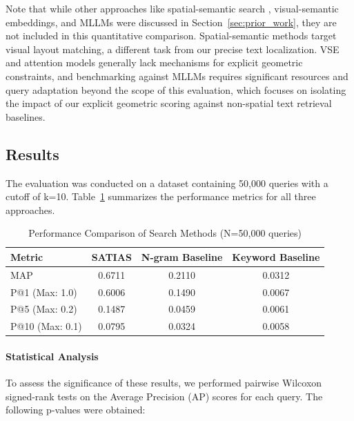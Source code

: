 \documentclass[manuscript,screen]{acmart}
\begin{document}
Note that while other approaches like spatial-semantic search \cite{Mai17}, visual-semantic embeddings, and MLLMs \cite{Huang24, Yin24} were discussed in Section~\ref{sec:prior_work}, they are not included in this quantitative comparison. Spatial-semantic methods target visual layout matching, a different task from our precise text localization. VSE and attention models generally lack mechanisms for explicit geometric constraints, and benchmarking against MLLMs requires significant resources and query adaptation beyond the scope of this evaluation, which focuses on isolating the impact of our explicit geometric scoring against non-spatial text retrieval baselines.

\subsection{Results}
\label{sec:results}

The evaluation was conducted on a dataset containing 50,000 queries with a cutoff of k=10. Table~\ref{tab:results} summarizes the performance metrics for all three approaches.

\begin{table}[t]
    \centering
    \caption{Performance Comparison of Search Methods (N=50,000 queries)}
    \label{tab:results}
    \begin{tabular}{lccc}
        \toprule
        \textbf{Metric} & \textbf{SATIAS} & \textbf{N-gram Baseline} & \textbf{Keyword Baseline} \\
        \midrule
        MAP             & 0.6711          & 0.2110                   & 0.0312                    \\
        \midrule %
        P@1 (Max: 1.0)  & 0.6006          & 0.1490                   & 0.0067                    \\
        P@5 (Max: 0.2)  & 0.1487          & 0.0459                   & 0.0061                    \\
        P@10 (Max: 0.1) & 0.0795          & 0.0324                   & 0.0058                    \\
        \bottomrule
    \end{tabular}
\end{table}

\paragraph{Statistical Analysis}

To assess the significance of these results, we performed pairwise Wilcoxon signed-rank tests on the Average Precision (AP) scores for each query. The following p-values were obtained:
\end{document}
